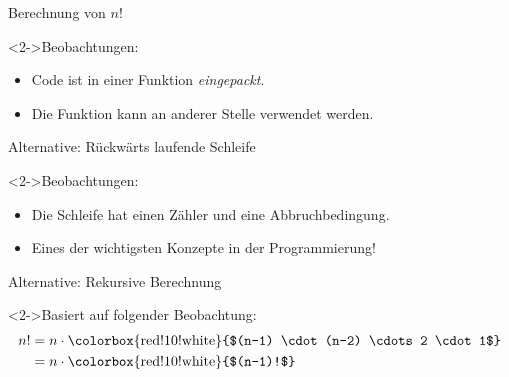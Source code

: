 \begin{fframe}
    \begin{block}{Berechnung von $n!$}
        \factorialfunction
    \end{block}
    \begin{block}<2->{Beobachtungen:}
        \begin{itemize}
            \item Code ist in einer \alert{Funktion} \emph{eingepackt}.
            \item Die Funktion kann an anderer Stelle verwendet werden.
        \end{itemize}
    \end{block}
\end{fframe}

\begin{fframe}
    \begin{block}{Alternative: Rückwärts laufende Schleife}
        \backwardsfunction
    \end{block}
    \begin{block}<2->{Beobachtungen:}
        \begin{itemize}
            \item Die Schleife hat einen \alert{Zähler} und eine \alert{Abbruchbedingung}.
            \item<3-> \alert{Eines der wichtigsten Konzepte in der Programmierung!}
        \end{itemize}
    \end{block}
\end{fframe}

\begin{fframe}
    \begin{block}{Alternative: Rekursive Berechnung}
        \recursive
    \end{block}
    \begin{block}<2->{Basiert auf folgender Beobachtung:}
        \vspace{-3ex}
        \begin{align*}
            n! &= n \cdot \text{\colorbox{red!10!white}{$(n-1) \cdot (n-2) \cdots 2 \cdot 1$}} \\
               &= n \cdot \text{\colorbox{red!10!white}{$(n-1)!$}}
        \end{align*}
    \end{block}
\end{fframe}
